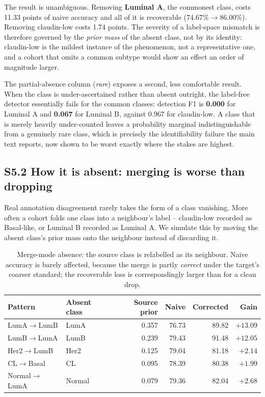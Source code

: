 \documentclass[11pt,a4paper]{article}
\begin{document}
The result is unambiguous. Removing \textbf{Luminal A}, the commonest class, costs
11.33 points of naive accuracy and all of it is recoverable ($74.67\% \rightarrow
86.00\%$). Removing claudin-low costs 1.74 points. The severity of a label-space
mismatch is therefore governed by the \emph{prior mass} of the absent class, not by its
identity: claudin-low is the mildest instance of the phenomenon, not a representative
one, and a cohort that omits a common subtype would show an effect an order of magnitude
larger.

The partial-absence column (\emph{rare}) exposes a second, less comfortable result. When
the class is under-ascertained rather than absent outright, the label-free detector
essentially fails for the common classes: detection F1 is
\textbf{0.000} for Luminal A and \textbf{0.067} for Luminal B, against 0.967 for
claudin-low. A class that is merely heavily under-counted leaves a probability marginal
indistinguishable from a genuinely rare class, which is precisely the identifiability
failure the main text reports, now shown to be worst exactly where the stakes are
highest.


\subsection*{S5.2 How it is absent: merging is worse than dropping}

Real annotation disagreement rarely takes the form of a class vanishing. More often a
cohort folds one class into a neighbour's label -- claudin-low recorded as Basal-like,
or Luminal B recorded as Luminal A. We simulate this by moving the absent class's prior
mass onto the neighbour instead of discarding it.

\begin{table}[H]
\centering
\caption{Merge-mode absence: the source class is relabelled as its neighbour.
Naive accuracy is barely affected, because the merge is partly \emph{correct} under the
target's coarser standard; the recoverable loss is correspondingly larger than for a
clean drop.}
\label{supp:tab:how}
\begin{tabular}{llrrrr}
\toprule
\textbf{Pattern} & \textbf{Absent class} & \textbf{Source prior} & \textbf{Naive} & \textbf{Corrected} & \textbf{Gain} \\
\midrule
    LumA$\rightarrow$LumB & LumA & 0.357 & 76.73 & 89.82 & $+13.09$ \\
    LumB$\rightarrow$LumA & LumB & 0.239 & 79.43 & 91.48 & $+12.05$ \\
    Her2$\rightarrow$LumB & Her2 & 0.125 & 79.04 & 81.18 & $+2.14$ \\
    CL$\rightarrow$Basal & CL & 0.095 & 78.39 & 80.38 & $+1.99$ \\
    Normal$\rightarrow$LumA & Normal & 0.079 & 79.36 & 82.04 & $+2.68$ \\
    \bottomrule
\end{tabular}
\end{table}
\end{document}
